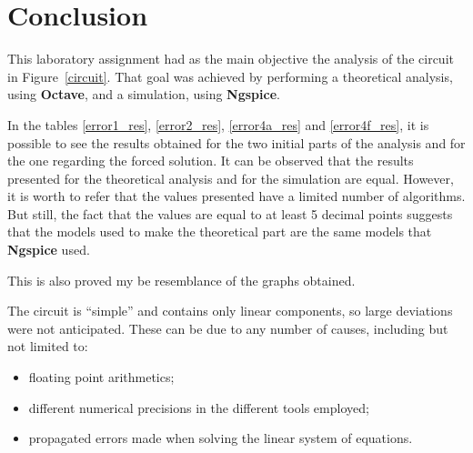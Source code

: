\section{Conclusion}
\label{sec:conclusion}

This laboratory assignment had as the main objective the analysis of the circuit in Figure~\ref{circuit}. That goal was achieved by performing a theoretical analysis, using {\bf Octave}, and a simulation, using {\bf Ngspice}.

In the tables \ref{error1_res}, \ref{error2_res}, \ref{error4a_res} and \ref{error4f_res}, it is possible to see the results obtained for the two initial parts of the analysis and for the one regarding the forced solution. It can be observed that the results presented for the theoretical analysis and for the simulation are equal. However, it is worth to refer that the values presented have a limited number of algorithms. But still, the fact that the values are equal to at least 5 decimal points suggests that the models used to make the theoretical part are the same models that {\bf Ngspice} used.

This is also proved my be resemblance of the graphs obtained.



The circuit is ``simple'' and contains only linear components, so large deviations were not anticipated. These can be due to any number of causes, including but not limited to:

\begin{itemize}
\item floating point arithmetics;
\item different numerical precisions in the different tools employed;
\item propagated errors made when solving the linear system of equations.
\end{itemize}



